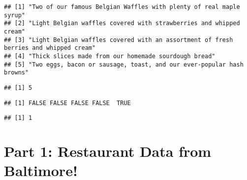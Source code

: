 \documentclass[
]{article}
\newenvironment{Shaded}{\begin{snugshade}}{\end{snugshade}}
\newcommand{\FunctionTok}[1]{\textcolor[rgb]{0.00,0.00,0.00}{#1}}
\newcommand{\NormalTok}[1]{#1}
\newcommand{\OtherTok}[1]{\textcolor[rgb]{0.56,0.35,0.01}{#1}}
\newcommand{\SpecialCharTok}[1]{\textcolor[rgb]{0.00,0.00,0.00}{#1}}
\newcommand{\StringTok}[1]{\textcolor[rgb]{0.31,0.60,0.02}{#1}}
\begin{document}
\begin{verbatim}
## [1] "Two of our famous Belgian Waffles with plenty of real maple syrup"                  
## [2] "Light Belgian waffles covered with strawberries and whipped cream"                  
## [3] "Light Belgian waffles covered with an assortment of fresh berries and whipped cream"
## [4] "Thick slices made from our homemade sourdough bread"                                
## [5] "Two eggs, bacon or sausage, toast, and our ever-popular hash browns"
\end{verbatim}

\begin{Shaded}
\end{Shaded}

\begin{verbatim}
## [1] 5
\end{verbatim}

\begin{Shaded}
\end{Shaded}

\begin{verbatim}
## [1] FALSE FALSE FALSE FALSE  TRUE
\end{verbatim}

\begin{Shaded}
\end{Shaded}

\begin{verbatim}
## [1] 1
\end{verbatim}

\hypertarget{part-1-restaurant-data-from-baltimore}{%
\section{Part 1: Restaurant Data from
Baltimore!}\label{part-1-restaurant-data-from-baltimore}}
\end{document}
